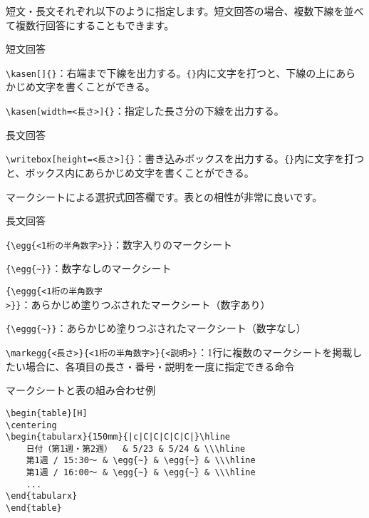 \begin{multicols*}{2}
短文・長文それぞれ以下のように指定します。短文回答の場合、複数下線を並べて複数行回答にすることもできます。
\begin{framebox-simple}{短文回答}
    \begin{reitemize}
        \item \verb|\kasen[]{}|：右端まで下線を出力する。\verb|{}|内に文字を打つと、下線の上にあらかじめ文字を書くことができる。
        \item \verb|\kasen[width=<長さ>]{}|：指定した長さ分の下線を出力する。
    \end{reitemize}
\end{framebox-simple}
\begin{framebox-simple}{長文回答}
    \begin{reitemize}
        \item \verb|\writebox[height=<長さ>]{}|：書き込みボックスを出力する。\verb|{}|内に文字を打つと、ボックス内にあらかじめ文字を書くことができる。
    \end{reitemize}
\end{framebox-simple}

マークシートによる選択式回答欄です。表との相性が非常に良いです。
\begin{framebox-simple}{長文回答}
    \begin{reitemize}
        \item \verb|{\egg{<1桁の半角数字>}}|：数字入りのマークシート
        \item \verb|{\egg{~}}|：数字なしのマークシート
        \item \verb|{\eggg{<1桁の半角数字>}}|：あらかじめ塗りつぶされたマークシート（数字あり）
        \item \verb|{\eggg{~}}|：あらかじめ塗りつぶされたマークシート（数字なし）
        \item \verb|\markegg{<長さ>}{<1桁の半角数字>}{<説明>}|：1行に複数のマークシートを掲載したい場合に、各項目の長さ・番号・説明を一度に指定できる命令
    \end{reitemize}
\end{framebox-simple}
\begin{framebox-ref}{マークシートと表の組み合わせ例}
\begin{verbatim}
\begin{table}[H]
\centering
\begin{tabularx}{150mm}{|c|C|C|C|C|C|}\hline
    日付（第1週・第2週）  & 5/23 & 5/24 & \\\hline
    第1週 / 15:30〜 & \egg{~} & \egg{~} & \\\hline
    第1週 / 16:00〜 & \egg{~} & \egg{~} & \\\hline
    ...
\end{tabularx}
\end{table}
\end{verbatim}
\end{framebox-ref}



\end{multicols*}
